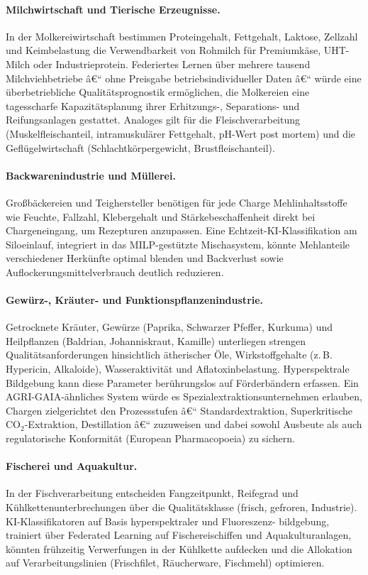 ﻿\documentclass[12pt,a4paper]{article}
\theoremstyle{plain}
\theoremstyle{definition}
\begin{document}
	\paragraph{Milchwirtschaft und Tierische Erzeugnisse.}
	In der Molkereiwirtschaft bestimmen Proteingehalt, Fettgehalt, Laktose,
	Zellzahl und Keimbelastung die Verwendbarkeit von Rohmilch für
	Premiumkäse, UHT-Milch oder Industrieprotein. Federiertes Lernen über
	mehrere tausend Milchviehbetriebe â€“ ohne Preisgabe betriebsindividueller
	Daten â€“ würde eine überbetriebliche Qualitätsprognostik ermöglichen,
	die Molkereien eine tagesscharfe Kapazitätsplanung ihrer Erhitzungs-,
	Separations- und Reifungsanlagen gestattet. Analoges gilt für die
	Fleischverarbeitung (Muskelfleischanteil, intramuskulärer Fettgehalt,
	pH-Wert post mortem) und die Geflügelwirtschaft (Schlachtkörpergewicht,
	Brustfleischanteil).

	\paragraph{Backwarenindustrie und Müllerei.}
	Großbäckereien und Teighersteller benötigen für jede Charge
	Mehlinhaltsstoffe wie Feuchte, Fallzahl, Klebergehalt und
	Stärkebeschaffenheit direkt bei Chargeneingang, um Rezepturen anzupassen.
	Eine Echtzeit-KI-Klassifikation am Siloeinlauf, integriert in das
	MILP-gestützte Mischasystem, könnte Mehlanteile verschiedener Herkünfte
	optimal blenden und Backverlust sowie Auflockerungsmittelverbrauch deutlich
	reduzieren.

	\paragraph{Gewürz-, Kräuter- und Funktionspflanzenindustrie.}
	Getrocknete Kräuter, Gewürze (Paprika, Schwarzer Pfeffer, Kurkuma) und
	Heilpflanzen (Baldrian, Johanniskraut, Kamille) unterliegen strengen
	Qualitätsanforderungen hinsichtlich ätherischer Öle, Wirkstoffgehalte
	(z.\,B. Hypericin, Alkaloide), Wasseraktivität und Aflatoxinbelastung.
	Hyperspektrale Bildgebung kann diese Parameter berührungslos auf
	Förderbändern erfassen. Ein AGRI-GAIA-ähnliches System würde es
	Spezialextraktionsunternehmen erlauben, Chargen zielgerichtet den
	Prozessstufen â€“ Standardextraktion, Superkritische CO$_2$-Extraktion,
	Destillation â€“ zuzuweisen und dabei sowohl Ausbeute als auch regulatorische
	Konformität (European Pharmacopoeia) zu sichern.

	\paragraph{Fischerei und Aquakultur.}
	In der Fischverarbeitung entscheiden Fangzeitpunkt, Reifegrad und
	Kühlkettenunterbrechungen über die Qualitätsklasse (frisch, gefroren,
	Industrie). KI-Klassifikatoren auf Basis hyperspektraler und Fluoreszenz-
	bildgebung, trainiert über Federated Learning auf Fischereischiffen und
	Aquakulturanlagen, könnten frühzeitig Verwerfungen in der
	Kühlkette aufdecken und die Allokation auf Verarbeitungslinien
	(Frischfilet, Räucherware, Fischmehl) optimieren.
\end{document}
